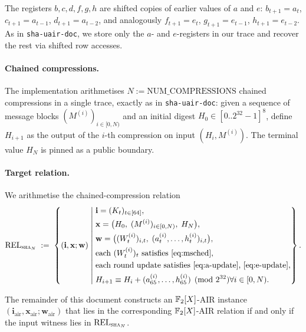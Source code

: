 \begin{remark}\label{rem:shift-register}
The registers $b,c,d,f,g,h$ are shifted copies of earlier values
of $a$ and $e$: $b_{t+1}=a_t$, $c_{t+1}=a_{t-1}$, $d_{t+1}=a_{t-2}$,
and analogously $f_{t+1}=e_t$, $g_{t+1}=e_{t-1}$, $h_{t+1}=e_{t-2}$.
As in \texttt{sha-uair-doc}, we store only the $a$- and $e$-registers
in our trace and recover the rest via shifted row accesses.
\end{remark}

\paragraph{Chained compressions.}
The implementation arithmetises $N := \mathrm{NUM\_COMPRESSIONS}$
chained compressions in a single trace, exactly as in
\texttt{sha-uair-doc}: given a sequence of
message blocks $(M^{(i)})_{i \in [0,N)}$ and an initial digest
$H_0 \in [0\mathbin{..}2^{32}-1]^8$, define $H_{i+1}$ as the output of
the $i$-th compression on input $(H_i, M^{(i)})$. The terminal value
$H_N$ is pinned as a public boundary.

\paragraph{Target relation.}
We arithmetise the chained-compression relation
\begin{equation}\label{eq:rel-sha}
\mathrm{REL}_{\textsc{sha}_N} \;:=\;
\left\{(\mathbf{i},\mathbf{x};\mathbf{w}) \;\middle|\;
\begin{aligned}
&\mathbf{i} = (K_t)_{t\in[64]}, \\
&\mathbf{x} = \bigl(H_0,\;(M^{(i)})_{i \in [0,N)},\;H_N\bigr), \\
&\mathbf{w} = \bigl((W_t^{(i)})_{i,t},\;(a_t^{(i)},\dots,h_t^{(i)})_{i,t}\bigr), \\
&\text{each } (W_t^{(i)})_t \text{ satisfies \eqref{eq:msched}}, \\
&\text{each round update satisfies \eqref{eq:a-update}, \eqref{eq:e-update}}, \\
&H_{i+1} \equiv H_i + (a_{65}^{(i)},\dots,h_{65}^{(i)}) \pmod{2^{32}} \forall i \in [0,N).
\end{aligned}\right\}.
\end{equation}

The remainder of this document constructs an $\mathbb{F}_2[X]$-AIR instance
$(\mathbf{i}_{\text{air}},\mathbf{x}_{\text{air}};\mathbf{w}_{\text{air}})$
that lies in the corresponding $\mathbb{F}_2[X]$-AIR relation if and only if
the input witness lies in $\mathrm{REL}_{\textsc{sha}_N}$.

